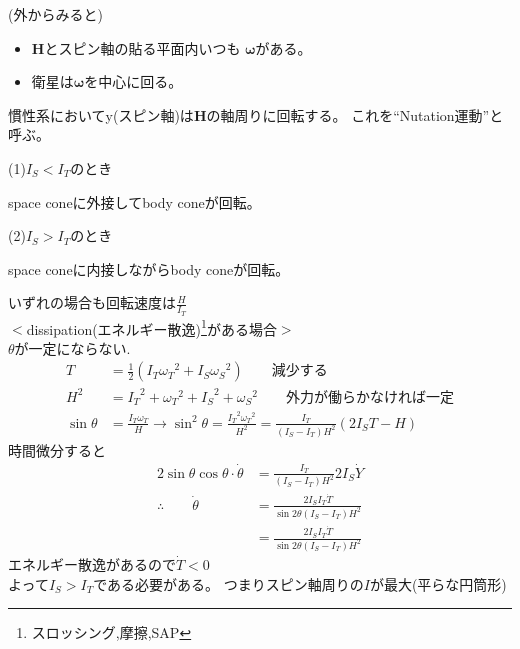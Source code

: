 \documentclass[class=article, crop=false, dvipdfmx]{standalone}
\begin{document}
\noindent
(外からみると)\\
\begin{center}

\end{center}

\begin{itemize}
\item $\bm{H}$とスピン軸の貼る平面内いつも
$\bm{\omega}$がある。
\item 衛星は$\bm{\omega}$を中心に回る。
\end{itemize}
慣性系においてy(スピン軸)は$\bm{H}$の軸周りに回転する。
これを``Nutation運動''と呼ぶ。

\begin{minipage}{0.45\linewidth}
(1)$I_S<I_T$のとき


\vspace{6mm}

space coneに外接してbody coneが回転。
\end{minipage}
\hfill
\begin{minipage}{0.45\linewidth}
(2)$I_S>I_T$のとき



space coneに内接しながらbody coneが回転。
\end{minipage}
\vspace{\baselineskip}

いずれの場合も回転速度は$\frac{H}{I_T}$
\\

\noindent
$<$dissipation(エネルギー散逸)\footnote{スロッシング,摩擦,SAP}がある場合$>$\\
$\theta$が一定にならない.
\begin{align}
T&=\frac{1}{2}(I_T{\omega_T}^2+I_S{\omega_S}^2)
\qquad \text{減少する}
\label{T}\\
H^2&=
{I_T}^2+{\omega_T}^2+{I_S}^2+{\omega_S}^2\qquad
\text{外力が働らかなければ一定}
\label{H}\\
\sin\theta&=\frac{I_T \omega_T}{H}\rightarrow
\sin^2\theta=\frac{{I_T}^2{\omega_T}^2}
{H^2}=\frac{I_T}{(I_S-I_T)H^2}(2I_ST-H)
\end{align}
時間微分すると
\begin{align}
2\sin\theta \cos\theta \cdot \dot{\theta}&=
\frac{I_T}{(I_S-I_T)H^2}2I_S\dot{Y}\\
\therefore\qquad \dot{\theta}&=
\frac{2I_SI_T\dot{T}}{\sin2\theta(I_S-I_T)H^2}\\
&=\frac{2I_SI_T\dot{T}}{\sin2\theta(I_S-I_T)H^2}
\end{align}
エネルギー散逸があるので$\dot{T}<0$\\
よって$I_S>I_T$である必要がある。
つまりスピン軸周りの$I$が最大(平らな円筒形)
\end{document}
